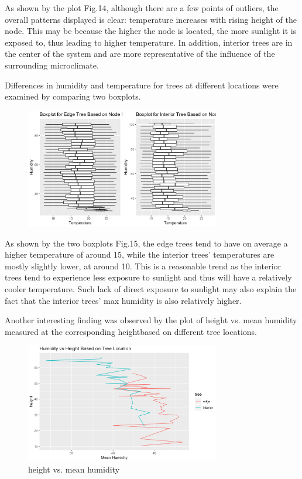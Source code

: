 \documentclass[twocolumn,11pt]{asme2ej}
\begin{document}
As shown by the plot Fig.14, although there are a few points of outliers, the overall patterns displayed is clear: temperature increases with rising height of the node. This may be because the higher the node is located, the more sunlight it is exposed to, thus leading to higher temperature. In addition, interior trees are in the center of the system and are more representative of the influence of the surrounding microclimate.  

Differences in humidity and temperature for trees at different locations were examined by comparing two boxplots. 

\begin{figure}
    \centering
    \includegraphics[width=85mm]{4b.png} 
    \caption{}
    \label{fig:4b}
\end{figure}

As shown by the two boxplots Fig.15, the edge trees tend to have on average a higher temperature of around 15, while the interior trees' temperatures are mostly slightly lower, at around 10. This is a reasonable trend as the interior trees tend to experience less exposure to sunlight and thus will have a relatively cooler temperature. Such lack of direct exposure to sunlight may also explain the fact that the interior trees' max humidity is also relatively higher. 

Another interesting finding was observed by the plot of height vs. mean humidity measured at the corresponding heightbased on different tree locations. 

\begin{figure}
    \centering
    \includegraphics[width=85mm]{4c.png} 
    \caption{height vs. mean humidity}
    \label{fig:4c}
\end{figure}
\end{document}
